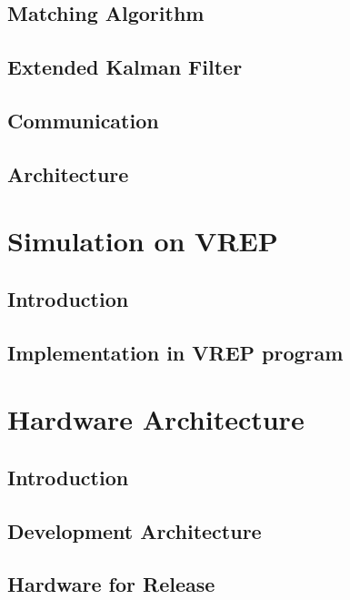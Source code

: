 \documentclass{book} %
\begin{document}
\section{Matching Algorithm}


\section{Extended Kalman Filter}


\section{Communication}


\section{Architecture}



\chapter{Simulation on VREP}
\section{Introduction}


\section{Implementation in VREP program}


\chapter{Hardware Architecture}
\section{Introduction}
\section{Development Architecture}
\section{Hardware for Release}
\end{document}
